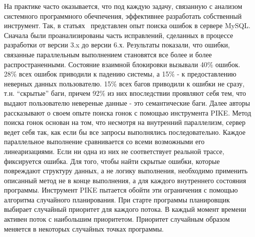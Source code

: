 На практике часто оказывается, что под каждую задачу, связанную с анализом системного программного обечпечения, эффективнее разработать собственный инструмент.
Так, в статьях~\cite{Fonseca:2010,Fonseca:2011} представлен опыт поиска ошибок в сервере MySQL.
Сначала были проанализированы часть исправлений, сделанных в процессе разработки от версии 3.x до версии 6.х.
Результаты показали, что ошибки, связанные параллельным выполнением становятся все более и более распространенными.
Состояние взаимной блокировки вызывали 40\% ошибок. 28\% всех ошибок приводили к падению системы, а 15\% - к предоставлению неверных данных пользователю.
15\% всех багов приводили к ошибки не сразу, т.н. “скрытые” баги, причем 92\% из них впоследствии проявляют себя тем, что выдают пользователю невереные данные - это семантические баги.
Далее авторы рассказывают о своем опыте поиска гонок с помощью инструмента PIKE.
Метод поиска гонок основан на том, что несмотря на внутренний параллелизм, сервер ведет себя так, как если бы все запросы выполнялись последовательно. 
Каждое параллельное выполнение сравнивается со всеми возможными его линеаризациями. Если ни одна из них не соответствует реальной трассе, фиксируется ошибка. 
Для того, чтобы найти скрытые ошибки, которые повреждают структуру данных, а не логику выполнения, необходимо применить описанный метод не в конце выполнения, а для каждого внутреннего состояния программы.
Инструмент PIKE пытается обойти эти ограничения с помощью алгоритма случайного планирования. При старте программы планировщик выбирает случайный приоритет для каждого потока. В каждый момент времени активен поток с наибольшим приоритетом. Приоритет случайным образом меняется в некоторых случайных точках программы. 

